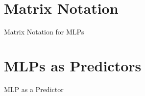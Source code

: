 \documentclass[aspectratio=169]{beamer}
\begin{document}
\section{Matrix Notation}
\begin{frame}{Matrix Notation for MLPs}
\end{frame}

\section{MLPs as Predictors}
\begin{frame}{MLP as a Predictor}
\end{frame}
\end{document}
